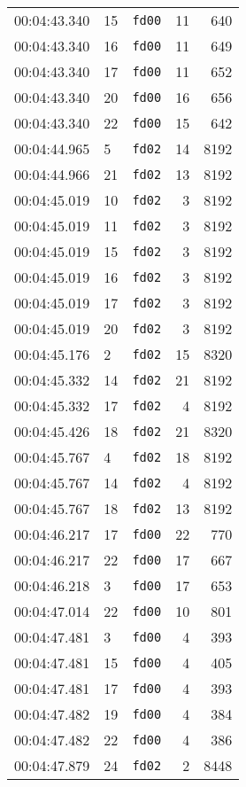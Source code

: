 \documentclass{article}
\begin{document}
\begin{longtable}{lllrr}
00:04:43.340 & 15 & \texttt{fd00} & 11 & 640 \\
00:04:43.340 & 16 & \texttt{fd00} & 11 & 649 \\
00:04:43.340 & 17 & \texttt{fd00} & 11 & 652 \\
00:04:43.340 & 20 & \texttt{fd00} & 16 & 656 \\
00:04:43.340 & 22 & \texttt{fd00} & 15 & 642 \\
00:04:44.965 & 5 & \texttt{fd02} & 14 & 8192 \\
00:04:44.966 & 21 & \texttt{fd02} & 13 & 8192 \\
00:04:45.019 & 10 & \texttt{fd02} & 3 & 8192 \\
00:04:45.019 & 11 & \texttt{fd02} & 3 & 8192 \\
00:04:45.019 & 15 & \texttt{fd02} & 3 & 8192 \\
00:04:45.019 & 16 & \texttt{fd02} & 3 & 8192 \\
00:04:45.019 & 17 & \texttt{fd02} & 3 & 8192 \\
00:04:45.019 & 20 & \texttt{fd02} & 3 & 8192 \\
00:04:45.176 & 2 & \texttt{fd02} & 15 & 8320 \\
00:04:45.332 & 14 & \texttt{fd02} & 21 & 8192 \\
00:04:45.332 & 17 & \texttt{fd02} & 4 & 8192 \\
00:04:45.426 & 18 & \texttt{fd02} & 21 & 8320 \\
00:04:45.767 & 4 & \texttt{fd02} & 18 & 8192 \\
00:04:45.767 & 14 & \texttt{fd02} & 4 & 8192 \\
00:04:45.767 & 18 & \texttt{fd02} & 13 & 8192 \\
00:04:46.217 & 17 & \texttt{fd00} & 22 & 770 \\
00:04:46.217 & 22 & \texttt{fd00} & 17 & 667 \\
00:04:46.218 & 3 & \texttt{fd00} & 17 & 653 \\
00:04:47.014 & 22 & \texttt{fd00} & 10 & 801 \\
00:04:47.481 & 3 & \texttt{fd00} & 4 & 393 \\
00:04:47.481 & 15 & \texttt{fd00} & 4 & 405 \\
00:04:47.481 & 17 & \texttt{fd00} & 4 & 393 \\
00:04:47.482 & 19 & \texttt{fd00} & 4 & 384 \\
00:04:47.482 & 22 & \texttt{fd00} & 4 & 386 \\
00:04:47.879 & 24 & \texttt{fd02} & 2 & 8448 \\

\end{longtable}
\end{document}

